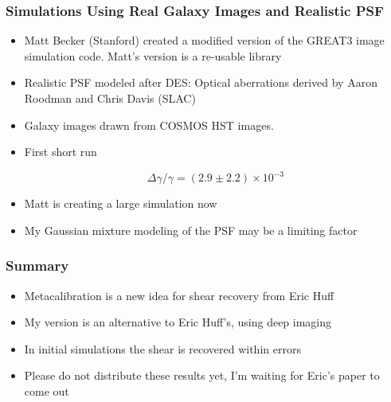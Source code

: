 \documentclass{beamer}
\begin{document}
\frame
{
    \frametitle{Simulations Using Real Galaxy Images and Realistic PSF}

 
    \begin{itemize}

        \item Matt Becker (Stanford) created a modified version of 
            the GREAT3 image simulation code. Matt's version is
            a re-usable library

        \item Realistic PSF modeled after DES:  Optical aberrations derived
            by Aaron Roodman and Chris Davis (SLAC)

        \item Galaxy images drawn from COSMOS HST images.

        \item First short run

            {\color{gold}
                \begin{equation}
                    \Delta \gamma/\gamma = (2.9 \pm 2.2) \times 10^{-3} \nonumber
                \end{equation}
            }
        \item Matt is creating a large simulation now

        \item My Gaussian mixture modeling of the PSF may be a limiting
            factor

    \end{itemize}

}

\frame
{
    \frametitle{Summary}

 
    \begin{itemize}
        \item Metacalibration is a new idea for shear recovery from
            Eric Huff

        \item My version is an alternative to Eric Huff's, using
            deep imaging
        
        \item In initial simulations the shear is recovered within errors

        \item {\color{red} Please do not distribute these results yet, I'm
            waiting for Eric's paper to come out}

    \end{itemize}

}
\end{document}
